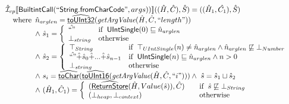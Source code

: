 \[\begin{array}{l}
\aI _{cp}\lbr \SF{BuiltintCall}(``\SF{String.fromCharCode}",args))\rbr((\hat{H},\hat{C}), \hat{S})
  = ((\hat{H}_1, \hat{C_1}), \hat{S})\\
\quad\wherec{
  \hat{n}_{arglen} = \ahf{toUInt32}(\hf{getArgValue}(\hat{H}, \hat{C}, ``length"))\\
  \land\ \hat{s}_1 = \left\{\begin{array}{ll}
       \hat{``"}
       & \ifc{\SF{UIntSingle}(0) \sqsubseteq \hat{n}_{arglen}}\\
     \bot_{string}& \owc
     \end{array}\right.\\
  \land\ \hat{s}_2 = \left\{\begin{array}{ll}
       \top_{String}
       & \ifc{\top_{UIntSingle}(n) \neq \hat{n}_{arglen} \land \hat{n}_{arglen} \not\sqsubseteq \bot_{Number}}\\
       \hat{``"} \hat{+} \hat{s}_0 \hat{+} ... \hat{+} \hat{s}_{n-1}
       & \ifc{\SF{UIntSingle}(n) \sqsubseteq \hat{n}_{arglen} \land n > 0}\\
       \bot_{string} & \owc
     \end{array}\right.\\
  \land\ s_i = \ahf{toChar}(\ahf{toUInt16}(\hf{getArgValue}(\hat{H}, \hat{C}, ``i"))) 
  \land\ \hat{s} = \hat{s}_1 \sqcup \hat{s}_2\\
  \land\ (\hat{H}_1, \hat{C}_1) = 
    \left\{\begin{array}{l@{\quad\quad}l}
      (\ahf{ReturnStore}(\hat{H}, Value(\hat{s})), \hat{C})
      & \ifc{\hat{s} \not\sqsubseteq \bot_{String}}\\
      (\bot_{heap}, \bot_{context}) & \owc \\
    \end{array}\right.\\
  }\\
\\\\  



\end{array}
\]


